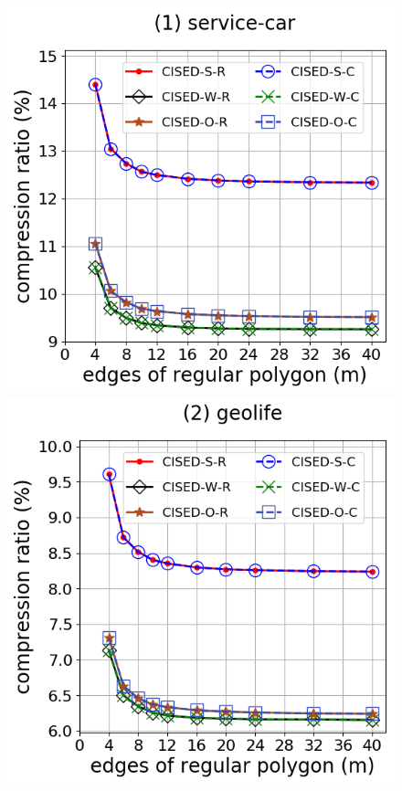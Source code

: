 

\begin{figure}[tb!]
\centering
\includegraphics[scale = 0.3]{Figures/Exp-M-e-60-CR-service.png}
\includegraphics[scale = 0.3]{Figures/Exp-M-e-60-CR-geolife.png}

\end{figure}
